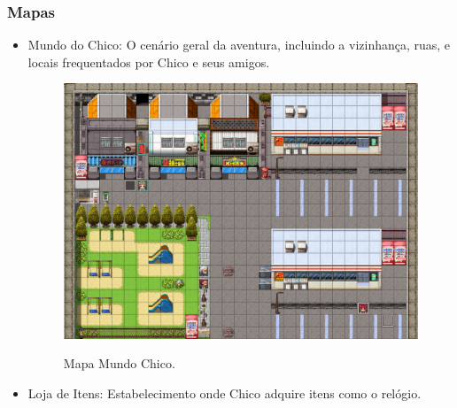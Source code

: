 \newpage

\subsubsection{Mapas}
\begin{itemize}
	\item Mundo do Chico: O cenário geral da aventura, incluindo a vizinhança, ruas, e locais frequentados por Chico e seus amigos.

	      \begin{figure}[ht]
		      \centering
		      \caption{Mapa Mundo Chico.}
		      \includegraphics[scale=0.3]{Textuais/Pictures/Mundo_chico.png}
		      \label{fig:mundo-chico}
	      \end{figure}


	\item Loja de Itens: Estabelecimento onde Chico adquire itens como o relógio.


\end{itemize}
